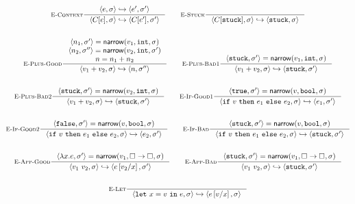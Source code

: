 \begin{figure*}
\begin{gather*}
\inference[\recontext]
  {\step{e}{\su}{e'}{\su'}}
  {\step{C[e]}{\su}{C[e']}{\su'}}
\qquad
\inference[\restuck]
  {}
  {\step{C[\stuck]}{\su}{\stuck}{\su}}
\\ \\
\inference[\replusgood]
  {\pair{n_1}{\su'} = \force{v_1}{\tint}{\su} \\
   \pair{n_2}{\su''} = \force{v_2}{\tint}{\su'} \\
   n = \eplus{n_1}{n_2}}
  {\step{\eplus{v_1}{v_2}}{\su}{n}{\su''}}
\qquad
\inference[\replusbadone]
  {\pair{\stuck}{\su'} = \force{v_1}{\tint}{\su}}
  {\step{\eplus{v_1}{v_2}}{\su}{\stuck}{\su'}}
\\ \\
\inference[\replusbadtwo]
  {\pair{\stuck}{\su'} = \force{v_2}{\tint}{\su}}
  {\step{\eplus{v_1}{v_2}}{\su}{\stuck}{\su'}}
\qquad
\inference[\reifgoodone]
  {\pair{\etrue}{\su'} = \force{v}{\tbool}{\su}}
  {\step{\eif{v}{e_1}{e_2}}{\su}{e_1}{\su'}}
\\ \\
\inference[\reifgoodtwo]
  {\pair{\efalse}{\su'} = \force{v}{\tbool}{\su}}
  {\step{\eif{v}{e_1}{e_2}}{\su}{e_2}{\su'}}
\qquad
\inference[\reifbad]
  {\pair{\stuck}{\su'} = \force{v}{\tbool}{\su}}
  {\step{\eif{v}{e_1}{e_2}}{\su}{\stuck}{\su'}}
\\ \\
\inference[\reappgood]
  {\pair{\efun{x}{e}}{\su'} = \force{v_1}{\tfun{\thole{}}{\thole{}}}{\su}}
  {\step{\eapp{v_1}{v_2}}{\su}{e\sub{x}{v_2}}{\su'}}
\qquad
\inference[\reappbad]
  {\pair{\stuck}{\su'} = \force{v_1}{\tfun{\thole{}}{\thole{}}}{\su}}
  {\step{\eapp{v_1}{v_2}}{\su}{\stuck}{\su'}}
\\ \\
\inference[\relet]
  {}
  {\step{\elet{x}{v}{e}}{\su}{e\sub{x}{v}}{\su}}
\end{gather*}
\\ %

\end{figure*}
